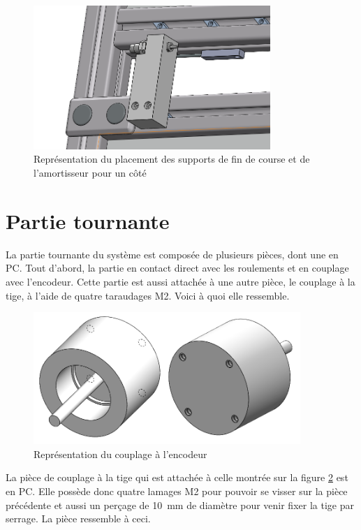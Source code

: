 \begin{figure}[H]
  \centering
  \includegraphics[width = 0.8\textwidth]{assets/figures/PlacementSupports.png}
  \caption{Représentation du placement des supports de fin de course et de l'amortisseur pour un côté}
  \label{fig:PlaceSup}
\end{figure}

\section{Partie tournante}\label{sec:PartieTour}
La partie tournante du système est composée de plusieurs pièces, dont une en \acrshort{PC}. Tout d'abord, la partie en contact direct
avec les roulements et en couplage avec l'encodeur. Cette partie est aussi attachée à une autre pièce, le couplage à la tige, à l'aide de
quatre taraudages M2. Voici à quoi elle ressemble.

\begin{figure}[H]
  \centering
  \includegraphics[width = 0.9\textwidth]{assets/figures/CouplageEncodeur.png}
  \caption{Représentation du couplage à l'encodeur}
  \label{fig:CouplEnco}
\end{figure}

La pièce de couplage à la tige qui est attachée à celle montrée sur la figure \ref{fig:CouplEnco} est en \acrshort{PC}. Elle possède donc quatre
lamages M2 pour pouvoir se visser sur la pièce précédente et aussi un perçage de 10~mm de diamètre pour venir fixer la tige par serrage.
La pièce ressemble à ceci.

